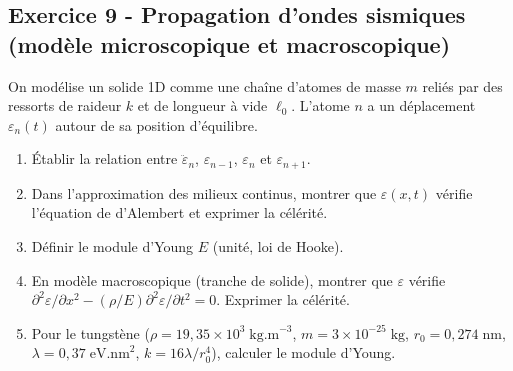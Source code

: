 \documentclass[12pt,a4paper]{article}
\begin{document}
\subsection*{Exercice 9 - Propagation d'ondes sismiques (modèle microscopique et macroscopique) \niveau{\difficile}}

\begin{boiteexercice}
On modélise un solide 1D comme une chaîne d'atomes de masse $m$ reliés par des ressorts de raideur $k$ et de longueur à vide $\ell_0$. L'atome $n$ a un déplacement $\varepsilon_n(t)$ autour de sa position d'équilibre.
\begin{enumerate}
  \item Établir la relation entre $\ddot{\varepsilon}_n$, $\varepsilon_{n-1}$, $\varepsilon_n$ et $\varepsilon_{n+1}$.
  \item Dans l'approximation des milieux continus, montrer que $\varepsilon(x,t)$ vérifie l'équation de d'Alembert et exprimer la célérité.
  \item Définir le module d'Young $E$ (unité, loi de Hooke).
  \item En modèle macroscopique (tranche de solide), montrer que $\varepsilon$ vérifie $\partial^2\varepsilon/\partial x^2 - (\rho/E)\partial^2\varepsilon/\partial t^2 = 0$. Exprimer la célérité.
  \item Pour le tungstène ($\rho = 19{,}35\times10^3\;\text{kg.m}^{-3}$, $m = 3\times10^{-25}\;\text{kg}$, $r_0 = 0{,}274\;\text{nm}$, $\lambda = 0{,}37\;\text{eV.nm}^2$, $k = 16\lambda/r_0^4$), calculer le module d'Young.
\end{enumerate}
\end{boiteexercice}
\end{document}
